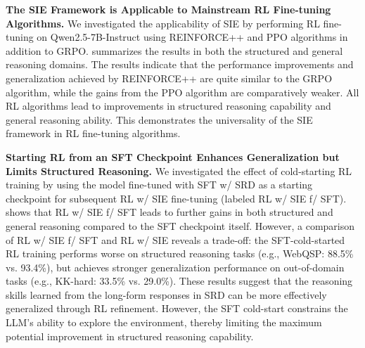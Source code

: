 \documentclass{article} %
\begin{document}
\textbf{The SIE Framework is Applicable to Mainstream RL Fine-tuning Algorithms.} 
We investigated the applicability of SIE by performing RL fine-tuning on Qwen2.5-7B-Instruct using REINFORCE++ \citep{hu2025reinforce++} and PPO \citep{schulman2017proximal} algorithms in addition to GRPO. 
 summarizes the results in both the structured and general reasoning domains. The results indicate that the performance improvements and generalization achieved by REINFORCE++ are quite similar to the GRPO algorithm, while the gains from the PPO algorithm are comparatively weaker. All RL algorithms lead to improvements in structured reasoning capability and general reasoning ability. This demonstrates the universality of the SIE framework in RL fine-tuning algorithms. 

\begin{table}[t!]
\vspace{-5pt}
\centering
\caption{Comparison of performance improvement in structured reasoning, mathematical reasoning, and logical reasoning tasks after fine-tuning Qwen2.5-7B-Instruct with different RL algorithms. The best results are highlighted in \textbf{bold}. REINFORCE++ and GRPO show comparable performance.}
\vspace{-5pt}
\label{tab:rl_method_comparison}
\end{table}


\textbf{Starting RL from an SFT Checkpoint Enhances Generalization but Limits Structured Reasoning.} 
We investigated the effect of cold-starting RL training by using the model fine-tuned with SFT w/ SRD as a starting checkpoint for subsequent RL w/ SIE fine-tuning (labeled RL w/ SIE f/ SFT). 
 shows that RL w/ SIE f/ SFT leads to further gains in both structured and general reasoning compared to the SFT checkpoint itself. 
However, a comparison of RL w/ SIE f/ SFT and RL w/ SIE reveals a trade-off: the SFT-cold-started RL training performs worse on structured reasoning tasks (e.g., WebQSP: 88.5\% vs. 93.4\%), but achieves stronger generalization performance on out-of-domain tasks (e.g., KK-hard: 33.5\% vs. 29.0\%). 
These results suggest that the reasoning skills learned from the long-form responses in SRD can be more effectively generalized through RL refinement. However, the SFT cold-start constrains the LLM's ability to explore the  environment, thereby limiting the maximum potential improvement in structured reasoning capability. 
\end{document}
